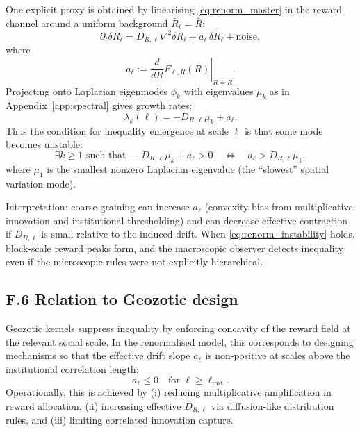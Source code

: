 \documentclass[12pt,a4paper]{article}
\theoremstyle{definition}
\begin{document}
One explicit proxy is obtained by linearising \eqref{eq:renorm_master} in the reward channel around a uniform
background $\bar{R}_\ell = \bar{R}$:
\begin{equation}
  \partial_t \delta \bar{R}_\ell
  =
  D_{R,\ell}\nabla^2 \delta \bar{R}_\ell
  +
  a_\ell\,\delta \bar{R}_\ell
  +
  \text{noise},
  \label{eq:linearised_reward}
\end{equation}
where
\begin{equation}
  a_\ell := \left.\frac{d}{dR}F_{\ell,R}(R)\right|_{R=\bar{R}}.
  \label{eq:aell_def}
\end{equation}
Projecting onto Laplacian eigenmodes $\phi_k$ with eigenvalues $\mu_k$ as in Appendix~\ref{app:spectral}
gives growth rates:
\begin{equation}
  \lambda_k(\ell) = -D_{R,\ell}\mu_k + a_\ell.
  \label{eq:mode_growth}
\end{equation}
Thus the condition for inequality emergence at scale $\ell$ is that some mode becomes unstable:
\begin{equation}
  \exists k \ge 1 \text{ such that }
  -D_{R,\ell}\mu_k + a_\ell > 0
  \quad \Longleftrightarrow \quad
  a_\ell > D_{R,\ell}\mu_1,
  \label{eq:renorm_instability}
\end{equation}
where $\mu_1$ is the smallest nonzero Laplacian eigenvalue (the ``slowest'' spatial variation mode).

Interpretation: coarse-graining can increase $a_\ell$ (convexity bias from multiplicative innovation and institutional
thresholding) and can decrease effective contraction if $D_{R,\ell}$ is small relative to the induced drift.
When \eqref{eq:renorm_instability} holds, block-scale reward peaks form, and the macroscopic observer detects inequality
even if the microscopic rules were not explicitly hierarchical.

\subsection*{F.6 Relation to Geozotic design}

Geozotic kernels suppress inequality by enforcing concavity of the reward field at the relevant social scale.
In the renormalised model, this corresponds to designing mechanisms so that the effective drift slope $a_\ell$
is non-positive at scales above the institutional correlation length:
\begin{equation}
  a_\ell \le 0 \quad \text{for } \ell \ge \ell_{\mathrm{inst}}.
  \label{eq:geozotic_renorm_goal}
\end{equation}
Operationally, this is achieved by (i) reducing multiplicative amplification in reward allocation, (ii) increasing
effective $D_{R,\ell}$ via diffusion-like distribution rules, and (iii) limiting correlated innovation capture.
\end{document}
